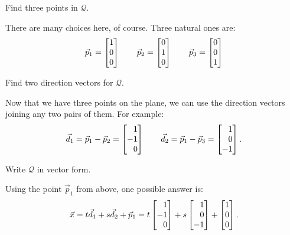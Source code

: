 	\begin{parts}
		\item Find three points in $\mathcal Q$.
			\begin{solution}
				There are many choices here, of course. Three natural ones are:
				\[
					\vec p_1 = \mat{1\\0\\0}
					\qquad
					\vec p_2 = \mat{0\\1\\0}
					\qquad
					\vec p_3 = \mat{0\\0\\1}
				\]
			\end{solution}
		\item Find two direction vectors for $\mathcal Q$.
			\begin{solution}
				Now that we have three points on the plane, we can use the
				direction vectors joining any two pairs of them. For example:
				\[
					\vec d_1 = \vec p_1 - \vec p_2 = \mat{1\\-1\\0}
					\qquad
					\vec d_2 = \vec p_1 - \vec p_3 = \mat{1\\0\\-1}.
				\]
			\end{solution}
		\item Write $\mathcal Q$ in vector form.
			\begin{solution}
				Using the point $\vec p_1$ from above, one possible answer is:
				\[
					\vec x = t\vec d_1 + s\vec d_2 + \vec p_1
					= t \mat{1\\-1\\0} + s \mat{1\\0\\-1} + \mat{1\\0\\0}.
				\]
			\end{solution}
	\end{parts}

